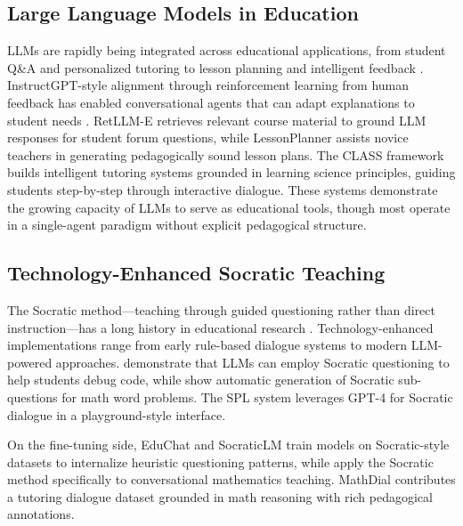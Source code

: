 \documentclass[11pt]{article}
\begin{document}
\subsection{Large Language Models in Education}

LLMs are rapidly being integrated across educational applications, from student Q\&A and personalized tutoring to lesson planning and intelligent feedback \citep{kasneci2023chatgpt, gan2023llmedu}. InstructGPT-style alignment through reinforcement learning from human feedback has enabled conversational agents that can adapt explanations to student needs \citep{chung2024scaling}. RetLLM-E \citep{mitra2024retllm} retrieves relevant course material to ground LLM responses for student forum questions, while LessonPlanner \citep{fan2024lessonplanner} assists novice teachers in generating pedagogically sound lesson plans. The CLASS framework \citep{sonkar2023class} builds intelligent tutoring systems grounded in learning science principles, guiding students step-by-step through interactive dialogue. These systems demonstrate the growing capacity of LLMs to serve as educational tools, though most operate in a single-agent paradigm without explicit pedagogical structure.

\subsection{Technology-Enhanced Socratic Teaching}

The Socratic method---teaching through guided questioning rather than direct instruction---has a long history in educational research \citep{seeskin1987socratic, chang1998socratic}. Technology-enhanced implementations range from early rule-based dialogue systems \citep{graesser2004autotutor} to modern LLM-powered approaches. \citet{alhossami2024socratic} demonstrate that LLMs can employ Socratic questioning to help students debug code, while \citet{shridhar2022mathword} show automatic generation of Socratic sub-questions for math word problems. The SPL system \citep{zhang2024spl} leverages GPT-4 for Socratic dialogue in a playground-style interface.

On the fine-tuning side, EduChat \citep{dan2023educhat} and SocraticLM \citep{liu2024socraticLM} train models on Socratic-style datasets to internalize heuristic questioning patterns, while \citet{ding2024socraticmath} apply the Socratic method specifically to conversational mathematics teaching. MathDial \citep{macina2023mathdial} contributes a tutoring dialogue dataset grounded in math reasoning with rich pedagogical annotations.
\end{document}
